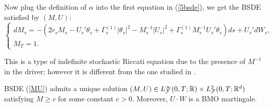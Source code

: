 \documentclass[final]{siamltex}
\begin{document}
Now plug  the definition of $\alpha$ into the first equation in (\ref{5bsde}), we get the BSDE satisfied by $(M,U)$:
\begin{equation}\label{MU}
\left\{\begin{array}{l}
        dM_s=-(2r_s M_s-U_s'\theta_s +\Gamma^{(1)}_s|\theta_s|^2- M_s^{-1}|U_s|^2+\Gamma^{(1)}_s M_s^{-1}U_s'\theta_s)ds+U_s' dW_s,\\
M_T=1.\end{array}\right.
\end{equation}

This is a type of indefinite stochastic Riccati equation due to the presence of $M^{-1}$ in the driver; however it is different from the one studied in
\cite{HuZhou}.

\begin{proposition}
BSDE (\ref{MU}) admits a  unique solution $(M,U)\in L_{\cal F}^\infty(0,T;\mathbb R)\times L_{\cal F}^2(0,T;\mathbb R^d)$ satisfying  $M\ge c$ for some  constant $c>0$. Moreover, $U\cdot W$ is a BMO martingale.
\end{proposition}
\end{document}
